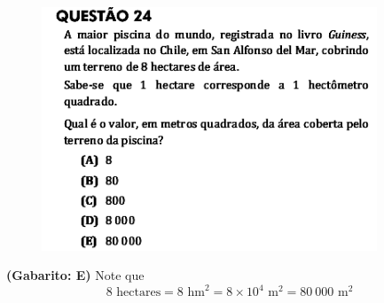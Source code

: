 \documentclass[a4paper]{article}
\begin{document}
\begin{figure}[H]
	\begin{center}
		\includegraphics[width=10cm]{L5Q24.png}
	\end{center}
\end{figure}
\par\textbf{(Gabarito: E)} Note que
\begin{equation*}
8\text{ hectares} = 8\text{ hm}^2 = 8\times 10^4\text{ m}^2 = 80\ 000\text{ m}^2
\end{equation*}
\end{document}
